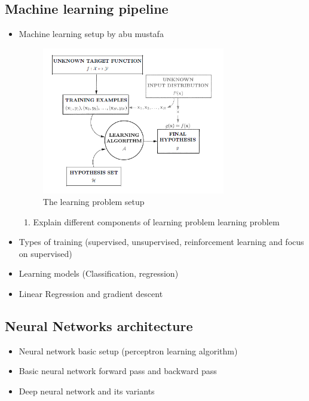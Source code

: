 \subsection{Machine learning pipeline}
    \begin{itemize}
        \item Machine learning setup by abu mustafa 
        \begin{figure}[t]
            \includegraphics[width=8cm]{thesis/figures/Learning problem.PNG}
            \centering
            \caption{The learning problem setup}
            \label{fig:The learning problem setup}
        \end{figure}
        \begin{enumerate}
            \item Explain different components of learning problem  learning problem 
            
        \end{enumerate}
        \item Types of training (supervised, unsupervised, reinforcement learning and focus on supervised)
        \item Learning models (Classification, regression)
        \item Linear Regression and gradient descent 
    \end{itemize}
\subsection{Neural Networks architecture}
    \begin{itemize}
        \item Neural network basic setup (perceptron learning algorithm)
        \item Basic neural network forward pass and backward pass
        \item  Deep neural network and its variants
    \end{itemize}
